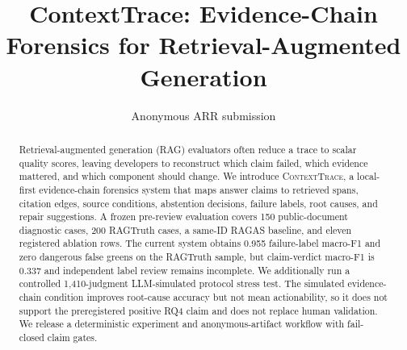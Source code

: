 \documentclass[11pt]{article}
\title{ContextTrace: Evidence-Chain Forensics for Retrieval-Augmented Generation}
\author{Anonymous ARR submission}
\begin{document}
\maketitle
\begin{abstract}
Retrieval-augmented generation (RAG) evaluators often reduce a trace to scalar
quality scores, leaving developers to reconstruct which claim failed, which
evidence mattered, and which component should change. We introduce
\textsc{ContextTrace}, a local-first evidence-chain forensics system that maps
answer claims to retrieved spans, citation edges, source conditions,
abstention decisions, failure labels, root causes, and repair suggestions. A
frozen pre-review evaluation covers 150 public-document diagnostic cases, 200
RAGTruth cases, a same-ID RAGAS baseline, and eleven registered ablation rows.
The current system obtains 0.955 failure-label macro-F1 and zero dangerous
false greens on the RAGTruth sample, but claim-verdict macro-F1 is 0.337 and
independent label review remains incomplete. We additionally run a controlled
1,410-judgment LLM-simulated protocol stress test. The simulated evidence-chain
condition improves root-cause accuracy but not mean actionability, so it does
not support the preregistered positive RQ4 claim and does not replace human
validation. We release a deterministic experiment and anonymous-artifact
workflow with fail-closed claim gates.
\end{abstract}
















\end{document}
